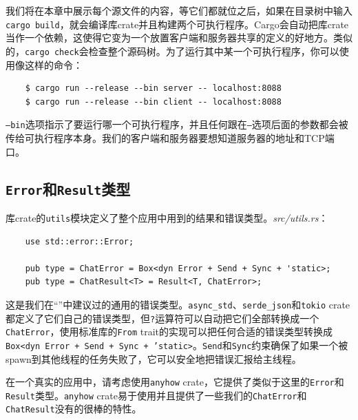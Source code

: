 我们将在本章中展示每个源文件的内容，等它们都就位之后，如果在目录树中输入\texttt{cargo build}，就会编译库crate并且构建两个可执行程序。Cargo会自动把库crate当作一个依赖，这使得它变为一个放置客户端和服务器共享的定义的好地方。类似的，\texttt{cargo check}会检查整个源码树。为了运行其中某一个可执行程序，你可以使用像这样的命令：
\begin{verbatim}
    $ cargo run --release --bin server -- localhost:8088
    $ cargo run --release --bin client -- localhost:8088
\end{verbatim}

\texttt{--bin}选项指示了要运行哪一个可执行程序，并且任何跟在\texttt{--}选项后面的参数都会被传给可执行程序本身。我们的客户端和服务器要想知道服务器的地址和TCP端口。

\subsection{\texttt{Error}和\texttt{Result}类型}
库crate的\texttt{utils}模块定义了整个应用中用到的结果和错误类型。\emph{src/utils.rs}：
\begin{verbatim}
    use std::error::Error;

    pub type = ChatError = Box<dyn Error + Send + Sync + 'static>;
    pub type = ChatResult<T> = Result<T, ChatError>;
\end{verbatim}

这是我们在“”中建议过的通用的错误类型。\texttt{async\_std}、\texttt{serde\_json}和\texttt{tokio} crate都定义了它们自己的错误类型，但\texttt{?}运算符可以自动把它们全部转换成一个\texttt{ChatError}，使用标准库的\texttt{From} trait的实现可以把任何合适的错误类型转换成\texttt{Box<dyn Error + Send + Sync + 'static>}。\texttt{Send}和\texttt{Sync}约束确保了如果一个被spawn到其他线程的任务失败了，它可以安全地把错误汇报给主线程。

在一个真实的应用中，请考虑使用\texttt{anyhow} crate，它提供了类似于这里的\texttt{Error}和\texttt{Result}类型。\texttt{anyhow} crate易于使用并且提供了一些我们的\texttt{ChatError}和\texttt{ChatResult}没有的很棒的特性。

